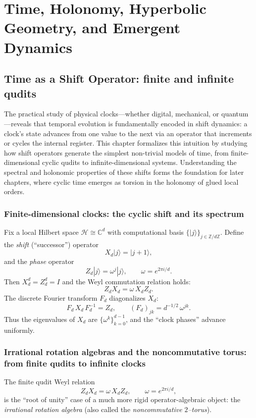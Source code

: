 \documentclass[11pt,oneside]{amsbook}
\numberwithin{equation}{section}
\theoremstyle{plain}
\theoremstyle{definition}
\theoremstyle{remark}
\newcommand{\Z}{\mathbb{Z}}
\newcommand{\C}{\mathbb{C}}
\newcommand{\cH}{\mathcal{H}}
\begin{document}
\part{Time, Holonomy, Hyperbolic Geometry, and Emergent Dynamics}

\chapter{Time as a Shift Operator: finite and infinite qudits}
\label{ch:time_shift}

The practical study of physical clocks—whether digital, mechanical, or quantum—reveals that temporal evolution is fundamentally encoded in shift dynamics: a clock's state advances from one value to the next via an operator that increments or cycles the internal register. This chapter formalizes this intuition by studying how shift operators generate the simplest non-trivial models of time, from finite-dimensional cyclic qudits to infinite-dimensional systems. Understanding the spectral and holonomic properties of these shifts forms the foundation for later chapters, where cyclic time emerges as torsion in the holonomy of glued local orders.

\section{Finite-dimensional clocks: the cyclic shift and its spectrum}
Fix a local Hilbert space $\cH\cong\C^d$ with computational basis $\{|j\rangle\}_{j\in\Z/d\Z}$.
Define the \emph{shift} (``successor'') operator
\[
X_d|j\rangle = |j+1\rangle,
\]
and the \emph{phase} operator
\[
Z_d|j\rangle = \omega^j |j\rangle,\qquad \omega=e^{2\pi i/d}.
\]
Then $X_d^d=Z_d^d=I$ and the Weyl commutation relation holds:
\[
Z_d X_d = \omega\, X_d Z_d.
\]
The discrete Fourier transform $F_d$ diagonalizes $X_d$:
\[
F_d\, X_d\, F_d^{-1} = Z_d,\qquad
(F_d)_{jk}=d^{-1/2}\,\omega^{jk}.
\]
Thus the eigenvalues of $X_d$ are $\{\omega^k\}_{k=0}^{d-1}$, and the ``clock phases'' advance uniformly.


\section{Irrational rotation algebras and the noncommutative torus: from finite qudits to infinite clocks}
\label{sec:irrational_rotation_algebra}

The finite qudit Weyl relation
\[
Z_d X_d = \omega\, X_d Z_d,\qquad \omega=e^{2\pi i/d},
\]
is the ``root of unity'' case of a much more rigid operator-algebraic object: the \emph{irrational rotation algebra}
(also called the \emph{noncommutative $2$--torus}).
\end{document}
